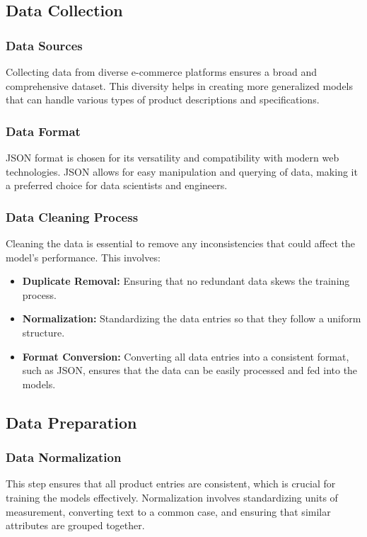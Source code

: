 \subsection{Data Collection}
\subsubsection{Data Sources}
Collecting data from diverse e-commerce platforms ensures a broad and comprehensive dataset. This diversity helps in creating more generalized models that can handle various types of product descriptions and specifications.

\subsubsection{Data Format}
JSON format is chosen for its versatility and compatibility with modern web technologies. JSON allows for easy manipulation and querying of data, making it a preferred choice for data scientists and engineers.

\subsubsection{Data Cleaning Process}
Cleaning the data is essential to remove any inconsistencies that could affect the model's performance. This involves:

\begin{itemize}
    \item \textbf{Duplicate Removal:} Ensuring that no redundant data skews the training process.
    \item \textbf{Normalization:} Standardizing the data entries so that they follow a uniform structure.
    \item \textbf{Format Conversion:} Converting all data entries into a consistent format, such as JSON, ensures that the data can be easily processed and fed into the models.
\end{itemize}

\subsection{Data Preparation}
\subsubsection{Data Normalization}
This step ensures that all product entries are consistent, which is crucial for training the models effectively. Normalization involves standardizing units of measurement, converting text to a common case, and ensuring that similar attributes are grouped together.

